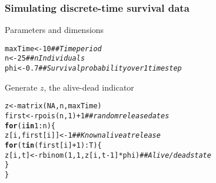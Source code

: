 \documentclass[color=usenames,dvipsnames]{beamer}\usepackage[]{graphicx}\usepackage[]{color}
\makeatletter
\newcommand{\hlnum}[1]{\textcolor[rgb]{0.69,0.494,0}{#1}}%
\newcommand{\hlcom}[1]{\textcolor[rgb]{0.514,0.506,0.514}{\textit{#1}}}%
\newcommand{\hlopt}[1]{\textcolor[rgb]{0,0,0}{#1}}%
\newcommand{\hlstd}[1]{\textcolor[rgb]{0,0,0}{#1}}%
\newcommand{\hlkwa}[1]{\textcolor[rgb]{0,0,0}{\textbf{#1}}}%
\newcommand{\hlkwb}[1]{\textcolor[rgb]{0,0.341,0.682}{#1}}%
\newcommand{\hlkwd}[1]{\textcolor[rgb]{0.004,0.004,0.506}{#1}}%
\newenvironment{kframe}{%
 \def\at@end@of@kframe{}%
 \ifinner\ifhmode%
  \def\at@end@of@kframe{\end{minipage}}%
  \begin{minipage}{\columnwidth}%
 \fi\fi%
 \def\FrameCommand##1{\hskip\@totalleftmargin \hskip-\fboxsep
 \colorbox{shadecolor}{##1}\hskip-\fboxsep
     \hskip-\linewidth \hskip-\@totalleftmargin \hskip\columnwidth}%
 \MakeFramed {\advance\hsize-\width
   \@totalleftmargin\z@ \linewidth\hsize
   \@setminipage}}%
 {\par\unskip\endMakeFramed%
 \at@end@of@kframe}
\newenvironment{knitrout}{}{} %
\makeatother
\begin{document}







\begin{frame}[fragile]
  \frametitle{Simulating discrete-time survival data}
  {%
    Parameters and dimensions}
\begin{knitrout}\footnotesize
{}\color{fgcolor}\begin{kframe}
\begin{alltt}
\hlstd{maxTime} \hlkwb{<-} \hlnum{10}           \hlcom{## Time period}
\hlstd{n} \hlkwb{<-} \hlnum{25}                 \hlcom{## nIndividuals}
\hlstd{phi} \hlkwb{<-} \hlnum{0.7}              \hlcom{## Survival probability over 1 time step}
\end{alltt}
\end{kframe}
\end{knitrout}
\pause
\vfill
{%
  Generate $z$, the alive-dead indicator}
\begin{knitrout}\footnotesize
{}\color{fgcolor}\begin{kframe}
\begin{alltt}
\hlstd{z} \hlkwb{<-} \hlkwd{matrix}\hlstd{(}\hlnum{NA}\hlstd{, n, maxTime)}
\hlstd{first} \hlkwb{<-} \hlkwd{rpois}\hlstd{(n,} \hlnum{1}\hlstd{)}\hlopt{+}\hlnum{1}  \hlcom{## random release dates}
\hlkwa{for}\hlstd{(i} \hlkwa{in} \hlnum{1}\hlopt{:}\hlstd{n) \{}
    \hlstd{z[i,first[i]]} \hlkwb{<-} \hlnum{1}  \hlcom{## Known alive at release}
    \hlkwa{for}\hlstd{(t} \hlkwa{in} \hlstd{(first[i]}\hlopt{+}\hlnum{1}\hlstd{)}\hlopt{:}\hlstd{T) \{}
        \hlstd{z[i,t]} \hlkwb{<-} \hlkwd{rbinom}\hlstd{(}\hlnum{1}\hlstd{,} \hlnum{1}\hlstd{, z[i,t}\hlopt{-}\hlnum{1}\hlstd{]}\hlopt{*}\hlstd{phi)} \hlcom{## Alive/dead state}
    \hlstd{\}}
\hlstd{\}}
\end{alltt}
\end{kframe}
\end{knitrout}
\end{frame}
\end{document}
